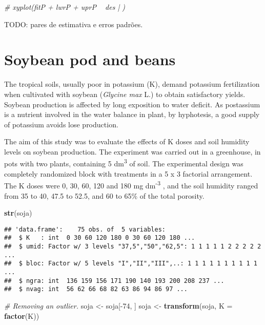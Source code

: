 \documentclass[9pt,a5paper,]{book}
\newenvironment{Shaded}{}{}
\newcommand{\KeywordTok}[1]{\textbf{{#1}}}
\newcommand{\DataTypeTok}[1]{\underline{{#1}}}
\newcommand{\DecValTok}[1]{{#1}}
\newcommand{\StringTok}[1]{{#1}}
\newcommand{\CommentTok}[1]{\textit{{#1}}}
\newcommand{\NormalTok}[1]{{#1}}
\renewenvironment{Shaded}{\color{inputcolor}}{}
\renewcommand{\DataTypeTok}[1]{{#1}}
\theoremstyle{definition}
\theoremstyle{definition}
\theoremstyle{remark}
\begin{document}
\begin{Shaded}
\begin{Highlighting}[]
\CommentTok{# xyplot(fitP + lwrP + uprP ~ des | )}
\end{Highlighting}
\end{Shaded}

TODO: pares de estimativa e erros padrões.

\section{Soybean pod and beans}\label{soybean-pod-and-beans}

The tropical soils, usually poor in potassium (K), demand potassium
fertilization when cultivated with soybean (\emph{Glycine max} L.) to
obtain satisfactory yields. Soybean production is affected by long
exposition to water deficit. As postassium is a nutrient involved in the
water balance in plant, by hyphotesis, a good supply of potassium avoids
lose production.

The aim of this study was to evaluate the effects of K doses and soil
humidity levels on soybean production. The experiment was carried out in
a greenhouse, in pots with two plants, containing 5
dm\textsuperscript{3} of soil. The experimental design was completely
randomized block with treatments in a 5 x 3 factorial arrangement. The K
doses were 0, 30, 60, 120 and 180 mg dm\textsuperscript{-3} , and the
soil humidity ranged from 35 to 40, 47.5 to 52.5, and 60 to 65\% of the
total porosity.

\begin{Shaded}
\begin{Highlighting}[]
\KeywordTok{str}\NormalTok{(soja)}
\end{Highlighting}
\end{Shaded}

\begin{verbatim}
## 'data.frame':    75 obs. of  5 variables:
##  $ K   : int  0 30 60 120 180 0 30 60 120 180 ...
##  $ umid: Factor w/ 3 levels "37,5","50","62,5": 1 1 1 1 1 2 2 2 2 2 ...
##  $ bloc: Factor w/ 5 levels "I","II","III",..: 1 1 1 1 1 1 1 1 1 1 ...
##  $ ngra: int  136 159 156 171 190 140 193 200 208 237 ...
##  $ nvag: int  56 62 66 68 82 63 86 94 86 97 ...
\end{verbatim}

\begin{Shaded}
\begin{Highlighting}[]
\CommentTok{# Removing an outlier.}
\NormalTok{soja <-}\StringTok{ }\NormalTok{soja[-}\DecValTok{74}\NormalTok{, ]}
\NormalTok{soja <-}\StringTok{ }\KeywordTok{transform}\NormalTok{(soja, }\DataTypeTok{K =} \KeywordTok{factor}\NormalTok{(K))}
\end{Highlighting}
\end{Shaded}
\end{document}
